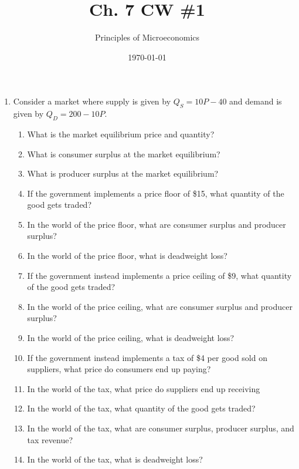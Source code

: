 \documentclass{article}
\title{Ch. 7 CW \#1}
\author{Principles of Microeconomics}
\date{\today}
\begin{document}
\maketitle

\begin{enumerate}

\item Consider a market where supply is given by $Q_S = 10P - 40$ and demand is given by $Q_D = 200 - 10P$.

	\begin{enumerate}
	
	\item What is the market equilibrium price and quantity?
	
	\item What is consumer surplus at the market equilibrium?
	
	\item What is producer surplus at the market equilibrium?
	
	\item If the government implements a price floor of \$15, what quantity of the good gets traded?
	
	\item In the world of the price floor, what are consumer surplus and producer surplus?
	
	\item In the world of the price floor, what is deadweight loss?
	
	\item If the government instead implements a price ceiling of \$9, what quantity of the good gets traded?
	
	\item In the world of the price ceiling, what are consumer surplus and producer surplus?
	
	\item In the world of the price ceiling, what is deadweight loss?
	
	\item If the government instead implements a tax of \$4 per good sold on suppliers, what price do consumers end up paying?
	
	\item In the world of the tax, what price do suppliers end up receiving
	
	\item In the world of the tax, what quantity of the good gets traded?
	
	\item In the world of the tax, what are consumer surplus, producer surplus, and tax revenue?
	
	\item In the world of the tax, what is deadweight loss?
	
	\end{enumerate}
	


\end{enumerate}
\end{document}

